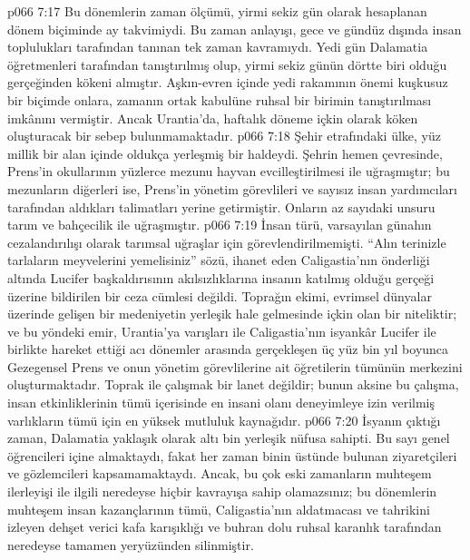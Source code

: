 \vs p066 7:17 Bu dönemlerin zaman ölçümü, yirmi sekiz gün olarak hesaplanan dönem biçiminde ay takvimiydi. Bu zaman anlayışı, gece ve gündüz dışında insan toplulukları tarafından tanınan tek zaman kavramıydı. Yedi gün Dalamatia öğretmenleri tarafından tanıştırılmış olup, yirmi sekiz günün dörtte biri olduğu gerçeğinden kökeni almıştır. Aşkın\hyp{}evren içinde yedi rakamının önemi kuşkusuz bir biçimde onlara, zamanın ortak kabulüne ruhsal bir birimin tanıştırılması imkânını vermiştir. Ancak Urantia’da, haftalık döneme içkin olarak köken oluşturacak bir sebep bulunmamaktadır.
\vs p066 7:18 Şehir etrafındaki ülke, yüz millik bir alan içinde oldukça yerleşmiş bir haldeydi. Şehrin hemen çevresinde, Prens’in okullarının yüzlerce mezunu hayvan evcilleştirilmesi ile uğraşmıştır; bu mezunların diğerleri ise, Prens’in yönetim görevlileri ve sayısız insan yardımcıları tarafından aldıkları talimatları yerine getirmiştir. Onların az sayıdaki unsuru tarım ve bahçecilik ile uğraşmıştır.
\vs p066 7:19 İnsan türü, varsayılan günahın cezalandırılışı olarak tarımsal uğraşlar için görevlendirilmemişti. “Alın terinizle tarlaların meyvelerini yemelisiniz” sözü, ihanet eden Caligastia’nın önderliği altında Lucifer başkaldırısının akılsızlıklarına insanın katılmış olduğu gerçeği üzerine bildirilen bir ceza cümlesi değildi. Toprağın ekimi, evrimsel dünyalar üzerinde gelişen bir medeniyetin yerleşik hale gelmesinde içkin olan bir niteliktir; ve bu yöndeki emir, Urantia’ya varışları ile Caligastia’nın isyankâr Lucifer ile birlikte hareket ettiği acı dönemler arasında gerçekleşen üç yüz bin yıl boyunca Gezegensel Prens ve onun yönetim görevlilerine ait öğretilerin tümünün merkezini oluşturmaktadır. Toprak ile çalışmak bir lanet değildir; bunun aksine bu çalışma, insan etkinliklerinin tümü içerisinde en insani olanı deneyimleye izin verilmiş varlıkların tümü için en yüksek mutluluk kaynağıdır.
\vs p066 7:20 İsyanın çıktığı zaman, Dalamatia yaklaşık olarak altı bin yerleşik nüfusa sahipti. Bu sayı genel öğrencileri içine almaktaydı, fakat her zaman binin üstünde bulunan ziyaretçileri ve gözlemcileri kapsamamaktaydı. Ancak, bu çok eski zamanların muhteşem ilerleyişi ile ilgili neredeyse hiçbir kavrayışa sahip olamazsınız; bu dönemlerin muhteşem insan kazançlarının tümü, Caligastia’nın aldatmacası ve tahrikini izleyen dehşet verici kafa karışıklığı ve buhran dolu ruhsal karanlık tarafından neredeyse tamamen yeryüzünden silinmiştir.
